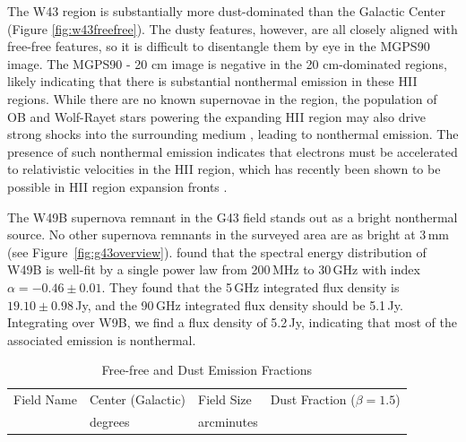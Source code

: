 \documentclass[twocolumn]{aastex62}
\begin{document}
The W43 region is substantially more dust-dominated than the Galactic Center
(Figure \ref{fig:w43freefree}).  The dusty features, however, are all closely
aligned with free-free features, so it is difficult to disentangle them by eye
in the MGPS90 image.  The MGPS90 - 20 cm image is negative in the 20
cm-dominated regions, likely indicating that there is substantial nonthermal
emission in these HII regions.  While there are no known supernovae in the region, the population
of OB and Wolf-Rayet stars powering the expanding HII region may also
drive strong shocks into the surrounding medium \citep[e.g.][]{Bally2010a}, leading to nonthermal emission.
The presence of such nonthermal emission indicates that electrons must be
accelerated to relativistic velocities in the HII region, which has recently
been shown to be possible in HII region expansion fronts
\citep{Padovani2019a}.

The W49B supernova remnant in the G43 field stands out as a bright nonthermal
source.  No other supernova remnants in the surveyed area are as bright at 3\,mm (see
Figure~\ref{fig:g43overview}). \citet{Sun2011a} found that the spectral energy
distribution of W49B is well-fit by a single power law from 200\,MHz to 30\,GHz
with index $\alpha=-0.46\pm0.01$.  They found that the 5\,GHz integrated flux density is
$19.10\pm0.98$\,Jy, and the 90\,GHz integrated flux density should be 5.1\,Jy.
Integrating over W9B, we find a flux density of 5.2\,Jy, indicating that most of
the associated emission is nonthermal. 

\begin{table}[htp]
\centering
\caption{Free-free and Dust Emission Fractions}
\begin{tabular}{llll}
    \label{tab:freefree}
Field Name   & Center (Galactic) & Field Size & Dust Fraction ($\beta=1.5$) \\
             & degrees           & arcminutes &                             \\
\hline
\hline

\hline
\hline
\end{tabular}
\end{table}
\end{document}
